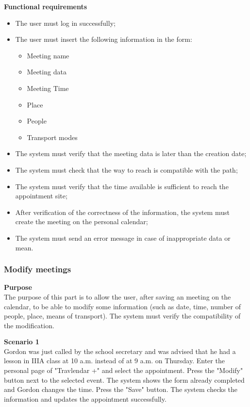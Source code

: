 \documentclass{article}
\begin{document}
	
	\bigskip
	\noindent
	\textbf{Functional requirements} \\
	\begin{itemize}
		\item The user must log in successfully;
		\item The user must insert the following information in the form:
			\begin{itemize}
				\item Meeting name
				\item Meeting data
				\item Meeting Time
				\item Place
				\item People
				\item Transport modes
			\end{itemize}
		\item The system must verify that the meeting data is later than the creation date;
		\item The system must check that the way to reach is compatible with the path;
		\item The system must verify that the time available is sufficient to reach the appointment site;
		\item After verification of the correctness of the information, the system must create the meeting on the personal calendar;
		\item The system must send an error message in case of inappropriate data or mean.
	\end{itemize}

	\subsubsection{Modify meetings}
	
	\bigskip
	\noindent
	\textbf{Purpose} \\
	The purpose of this part is to allow the user, after saving an meeting on the calendar, to be able to modify some information (such as date, time, number of people, place, means of transport). The system must verify the compatibility of the modification.
	
	\bigskip
	\noindent
	\textbf{Scenario 1} \\
	Gordon was just called by the school secretary and was advised that he had a lesson in IIIA class at 10 a.m. instead of at 9 a.m. on Thursday. Enter the personal page of "Travlendar +" and select the appointment. Press the "Modify" button next to the selected event. The system shows the form already completed and Gordon changes the time. Press the "Save" button. The system checks the information and updates the appointment successfully.
	
\end{document}
